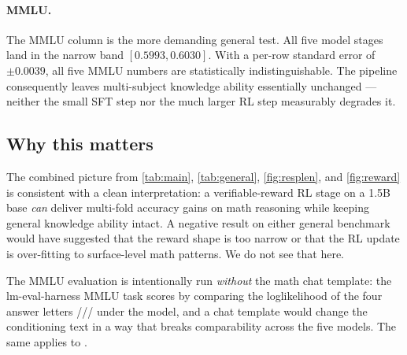 \paragraph{MMLU.}
The MMLU column is the more demanding general test. All five model
stages land in the narrow band $[0.5993, 0.6030]$. With a per-row standard
error of $\pm 0.0039$, all five MMLU numbers are statistically
indistinguishable. The pipeline consequently leaves multi-subject knowledge
ability essentially unchanged --- neither the small SFT step nor the much
larger RL step measurably degrades it.

\subsection{Why this matters}
The combined picture from \cref{tab:main}, \cref{tab:general},
\cref{fig:resplen}, and \cref{fig:reward} is consistent with a clean
interpretation: a verifiable-reward RL stage on a 1.5B base \emph{can}
deliver multi-fold accuracy gains on math reasoning while keeping general
knowledge ability intact. A negative result on either general benchmark
would have suggested that the reward shape is too narrow or that the RL
update is over-fitting to surface-level math patterns. We do not see that
here.

\begin{remark}
The MMLU evaluation is intentionally run \emph{without} the math chat
template: the lm-eval-harness MMLU task scores by comparing the
loglikelihood of the four answer letters ///
under the model, and a chat template would change the conditioning text
in a way that breaks comparability across the five models. The same
applies to .
\end{remark}
